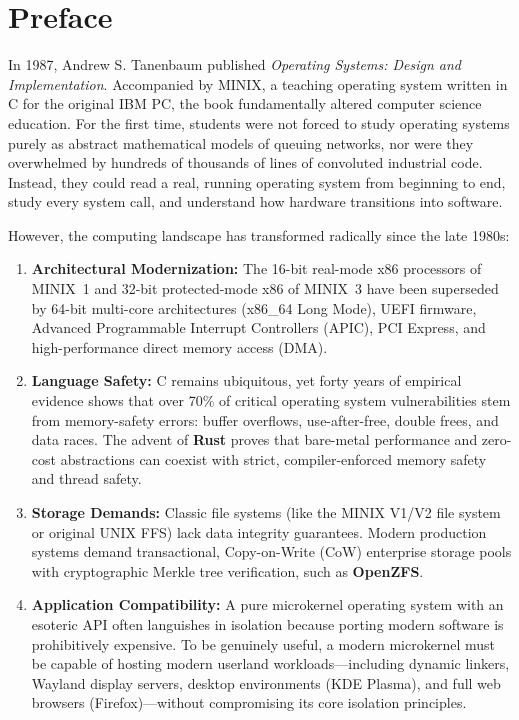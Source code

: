 \chapter*{Preface}

In 1987, Andrew S. Tanenbaum published \textit{Operating Systems: Design and Implementation}. Accompanied by MINIX, a teaching operating system written in C for the original IBM PC, the book fundamentally altered computer science education. For the first time, students were not forced to study operating systems purely as abstract mathematical models of queuing networks, nor were they overwhelmed by hundreds of thousands of lines of convoluted industrial code. Instead, they could read a real, running operating system from beginning to end, study every system call, and understand how hardware transitions into software.

However, the computing landscape has transformed radically since the late 1980s:
\begin{enumerate}
    \item \textbf{Architectural Modernization:} The 16-bit real-mode x86 processors of MINIX~1 and 32-bit protected-mode x86 of MINIX~3 have been superseded by 64-bit multi-core architectures (x86\_64 Long Mode), UEFI firmware, Advanced Programmable Interrupt Controllers (APIC), PCI Express, and high-performance direct memory access (DMA).
    \item \textbf{Language Safety:} C remains ubiquitous, yet forty years of empirical evidence shows that over 70\% of critical operating system vulnerabilities stem from memory-safety errors: buffer overflows, use-after-free, double frees, and data races. The advent of \textbf{Rust} proves that bare-metal performance and zero-cost abstractions can coexist with strict, compiler-enforced memory safety and thread safety.
    \item \textbf{Storage Demands:} Classic file systems (like the MINIX V1/V2 file system or original UNIX FFS) lack data integrity guarantees. Modern production systems demand transactional, Copy-on-Write (CoW) enterprise storage pools with cryptographic Merkle tree verification, such as \textbf{OpenZFS}.
    \item \textbf{Application Compatibility:} A pure microkernel operating system with an esoteric API often languishes in isolation because porting modern software is prohibitively expensive. To be genuinely useful, a modern microkernel must be capable of hosting modern userland workloads—including dynamic linkers, Wayland display servers, desktop environments (KDE Plasma), and full web browsers (Firefox)—without compromising its core isolation principles.
\end{enumerate}

